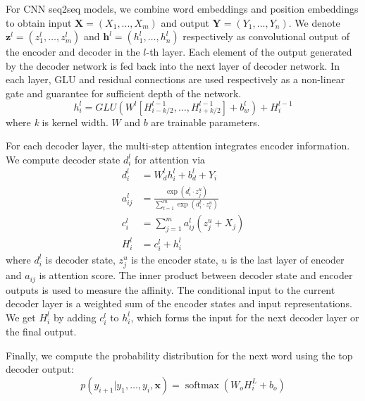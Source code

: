 For CNN seq2seq models, we combine word embeddings and position embeddings to obtain input $\mathbf{X} = (X_1,...,X_m)$ and output $\mathbf{Y}=(Y_1,...,Y_n)$. 
We denote $\mathbf { z } ^ { l } = \left( z _ { 1 } ^ { l } , \ldots , z _ { m     } ^ { l } \right)$ and $\mathbf { h } ^ { l } = \left( h _ { 1 } ^ { l } , \ldots , h _ { n } ^ { l } \right)$ 
respectively as convolutional output of the encoder and
decoder in the $l$-th layer.
Each element of the output generated by the decoder network is fed
back into the next layer of decoder network.
In each layer, GLU \citep{DauphinFAG17} and residual connections \citep{HeZRS16}
are used respectively as a non-linear gate and guarantee for sufficient depth of the network.  
\begin{equation}
    h _ { i } ^ { l } = GLU \left( W ^ { l } \left[ H _ {i-k/2 } ^ { l - 1 } , \ldots , H _ { i+k/2 } ^ { l - 1 } \right] + b _ { w } ^ { l } \right) + H _ { i } ^ { l - 1 }
\end{equation} 
where \textit{k} is kernel width. $W$ and $b$ are trainable parameters.

For each decoder layer, the multi-step attention integrates encoder information. 
We compute decoder state $d_{i}^{l}$ for attention via
\begin{align}
    d _ { i } ^ { l } &= W _ { d } ^ { l } h _ { i } ^ { l } + b _ { d } ^ { l } + Y _ { i } \\
    a _ { i j } ^ { l } &= \frac { \exp \left( d _ { i } ^ { l } \cdot z _ { j } ^ { u } \right) } { \sum _ { t = 1 } ^ { m } \exp \left( d _ { i } ^ { l } \cdot z _ { t } ^ { u } \right) } \label{eq:a} \\
    c _ { i } ^ { l } &= \sum _ { j = 1 } ^ { m } a _ { i j } ^ { l } \left( z _ { j } ^ { u } + X_j \right) \label{eq:c}\\
	H_i^l &= c _ { i } ^ { l } + h_i^l \label{eq:H}
\end{align}
where $d_{i}^{l}$ is decoder state, $z_{j}^{u}$ is the encoder state, 
$u$ is the last layer of encoder
and $a_{ij}$ is attention score.
The inner product between decoder state and encoder outputs is used 
to measure the affinity. 
The conditional input to the current 
decoder layer is a weighted sum of the encoder states and input representations.
We get $H^l_i$ by adding $c _ { i } ^ { l }$ to $h_{i}^{l}$, which forms the input for the next decoder layer or the final output.

Finally, we compute the probability distribution for the next word
using the top decoder output:
\begin{equation}
	p \left( y _ { i + 1 } | y _ { 1 } , \ldots , y _ { i } , \mathbf { x } \right) = \operatorname { softmax } \left( W _ { o } H _ { i } ^ { L } + b _ { o } \right)
\end{equation}

